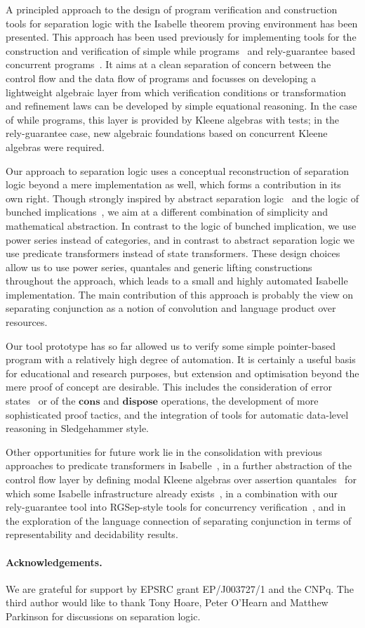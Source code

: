 \documentclass[twoside,runningheads,envcountsame,envcountsect,oribibl,orivec]{llncs}
\begin{document}
A principled approach to the design of program verification and
construction tools for separation logic with the Isabelle theorem
proving environment has been presented. This approach has been used
previously for implementing tools for the construction and
verification of simple while programs~\cite{sefm2014} and rely-guarantee
based concurrent programs~\cite{fm2014}. It aims at a clean separation of
concern between the control flow and the data flow of programs and
focusses on developing a lightweight algebraic layer from which
verification conditions or transformation and refinement laws can be
developed by simple equational reasoning. In the case of while
programs, this layer is provided by Kleene algebras with
tests; in the rely-guarantee case, new algebraic
foundations based on concurrent Kleene algebras were required.

Our approach to separation logic uses a conceptual reconstruction of
separation logic beyond a mere implementation as well, which forms a
contribution in its own right. Though strongly inspired by abstract
separation logic~\cite{COY07} and the logic of bunched
implications~\cite{OHearnP99}, we aim at a different combination of
simplicity and mathematical abstraction. In contrast to the logic of
bunched implication, we use power series instead of categories, and in
contrast to abstract separation logic we use predicate transformers
instead of state transformers. These design choices allow us to use
power series, quantales and generic lifting constructions throughout
the approach, which leads to a small and highly automated Isabelle
implementation. The main contribution of this approach is probably the
view on separating conjunction as a notion of convolution and language
product over resources.

Our tool prototype has so far allowed us to verify some simple
pointer-based program with a relatively high degree of automation. It
is certainly a useful basis for educational and research purposes, but
extension and optimisation beyond the mere proof of concept are
desirable. This includes the consideration of error
states~\cite{COY07} or of the $\mathbf{cons}$ and $\mathbf{dispose}$
operations, the development of more sophisticated proof tactics, and
the integration of tools for automatic data-level reasoning in
Sledgehammer style.

Other opportunities for future work lie in the consolidation with
previous approaches to predicate transformers in
Isabelle~\cite{Preoteasa11}, in a further abstraction of the control
flow layer by defining modal Kleene algebras over assertion
quantales~\cite{MoellerStruth} for which some Isabelle infrastructure
already exists~\cite{GuttmannSW11}, in a combination with our
rely-guarantee tool into RGSep-style tools for concurrency
verification~\cite{Vafeiadis}, and in the exploration of the language
connection of separating conjunction in terms of representability and
decidability results.

\paragraph*{Acknowledgements.}  We are grateful for support by EPSRC
grant EP/J003727/1 and the CNPq. The third author would like to thank
Tony Hoare, Peter O'Hearn and Matthew Parkinson for discussions on
separation logic.






\end{document}
